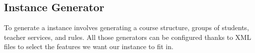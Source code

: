 
%
%

\subsection{Instance Generator}

To generate a \UTP{} instance %
involves generating a course structure,
groups of students, 
teacher services, 
and rules.
All those generators can be configured thanks to XML files to select the features we want our instance to fit in.



